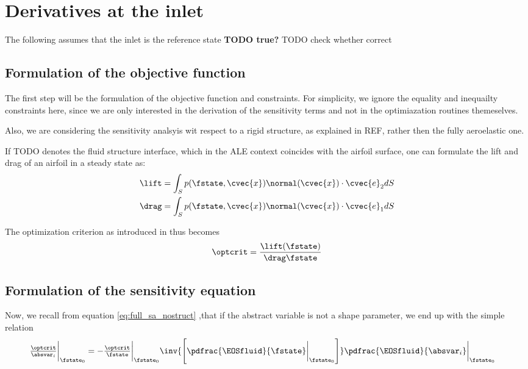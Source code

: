 \documentclass[../main.tex]{subfiles}
\begin{document}
\section{Derivatives at the inlet}
The following assumes that the inlet is the reference state \textbf{TODO true?}
TODO check whether correct







\cleardoublepage

%
\subsection{Formulation of the objective function}
The first step will be the formulation of the objective function and constraints. For simplicity, we ignore the equality and inequailty constraints here, since we are only interested in the derivation of the sensitivity terms and not in the optimiazation routines themeselves.

Also, we are considering the sensitivity analsyis wit respect to a rigid structure, as explained in REF, rather then the fully aeroelastic one.

If TODO denotes the fluid structure interface, which in the \ac{ALE} context coincides with the airfoil surface, one can formulate the lift and drag of an airfoil in a steady state as:
\begin{align}
\lift=\int_{S} p(\fstate,\cvec{x}) \normal(\cvec{x})\cdot \cvec{e}_2 dS \\
\drag=\int_{S} p(\fstate,\cvec{x}) \normal(\cvec{x})\cdot \cvec{e}_1 dS \\
\end{align}

The optimization criterion as introduced in \REF thus becomes
\begin{align}
\optcrit=\frac{\lift(\fstate)}{\drag\fstate}
\end{align}


\subsection{Formulation of the sensitivity equation}
Now, we recall from equation \eqref{eq:full_sa_nostruct} ,that if the abstract variable is not a shape parameter, we end up with the simple relation
\begin{align}\label{eq:manualmach_ToptcritBYabsvarI_expansion}
\tfrac{\optcrit}{\absvar_i}\bigg\rvert_{\fstate_0} &=
-\tfrac{\optcrit}{\fstate}\bigg\rvert_{\fstate_0}
\inv{\left[\pdfrac{\EOSfluid}{\fstate}\bigg\rvert_{\fstate_0}\right]}
\pdfrac{\EOSfluid}{\absvar_i}\bigg\rvert_{\fstate_0}
\end{align}
\end{document}
